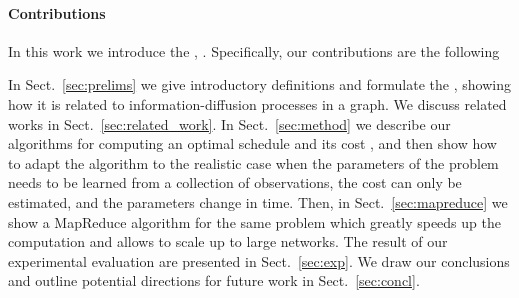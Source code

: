 \paragraph*{Contributions}
In this work we introduce the \probname, .  Specifically, our
contributions are the following

\begin{itemize*}
	\item {}
\end{itemize*}

 In Sect.~\ref{sec:prelims} we give introductory
definitions and formulate the \probname, showing how it is related to
information-diffusion processes in a graph. We discuss related works in
Sect.~\ref{sec:related_work}. In Sect.~\ref{sec:method} we describe our
algorithms for computing an optimal schedule and its cost , and then show how to adapt the algorithm
to the realistic case when the parameters of the problem needs to be learned
from a collection of observations, the cost can only be estimated, and the
parameters change in time. Then, in Sect.~\ref{sec:mapreduce} we show a
MapReduce algorithm for the same problem which greatly speeds up the computation
and allows to scale up to large networks. The result of our experimental
evaluation are presented in Sect.~\ref{sec:exp}. We draw our conclusions and
outline potential directions for future work in Sect.~\ref{sec:concl}.
